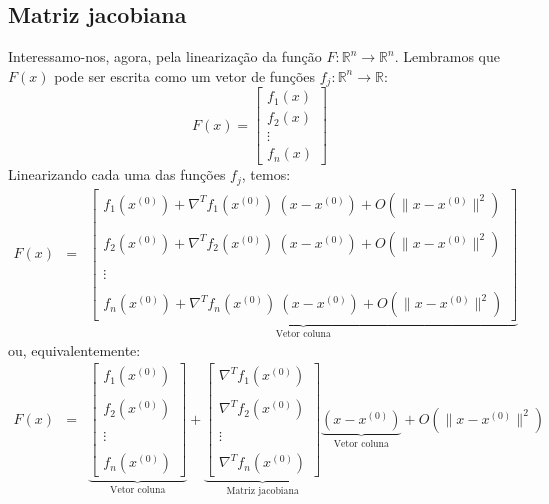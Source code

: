 \subsection{Matriz jacobiana}
Interessamo-nos, agora, pela linearização da função $F:\mathbb{R}^n\to \mathbb{R}^n$. Lembramos que $F(x)$ pode ser escrita como um vetor de funções $f_j:\mathbb{R}^n\to\mathbb{R}$:
\begin{equation}
  F(x)=\left[\begin{matrix}
      f_1(x)\\
      f_2(x)\\
      \vdots\\
      f_n(x)
    \end{matrix}\right]
\end{equation}
Linearizando cada uma das funções $f_j$, temos:
\begin{eqnarray}
F(x)&=&\underbrace{\left[
\begin{array}{c}
f_1\left(x^{(0)}\right)+\nabla^T\! f_1(x^{(0)})\!~\left(x-x^{(0)}\right)   + O(\|x-x^{(0)}\|^2)\\~\\
f_2\left(x^{(0)}\right)+\nabla^T\! f_2(x^{(0)})\!~\left(x-x^{(0)}\right)   + O(\|x-x^{(0)}\|^2)\\~\\
\vdots\\~\\
f_n\left(x^{(0)}\right)+\nabla^T\! f_n(x^{(0)})\!~\left(x-x^{(0)}\right)   + O(\|x-x^{(0)}\|^2)
\end{array}
\right]}_{\text{Vetor coluna}}
\end{eqnarray}
ou, equivalentemente:
\begin{eqnarray}
 F(x) &=&\underbrace{\left[
\begin{array}{c}
f_1\left(x^{(0)}\right)\\~\\
f_2\left(x^{(0)}\right)\\~\\
\vdots\\~\\
f_n\left(x^{(0)}\right)
\end{array}
\right]}_{\text{Vetor coluna}}+
\underbrace{\left[
\begin{array}{c}\nabla^T\! f_1(x^{(0)})\\~~\\
\nabla^T\! f_2(x^{(0)})\\~~\\
\vdots\\~~\\
\nabla^T\! f_n(x^{(0)})
\end{array}
\right]}_{\text{Matriz jacobiana}}\underbrace{\left(x-x^{(0)}\right)}_{\text{Vetor coluna}}+O(\|x-x^{(0)}\|^2)
\end{eqnarray}

